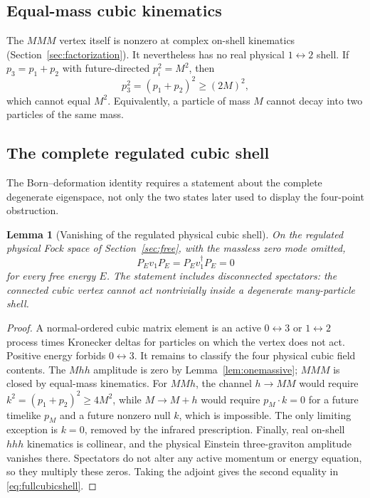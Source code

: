 \documentclass[11pt]{article}
\newtheorem{lemma}[theorem]{Lemma}
\theoremstyle{definition}
\theoremstyle{remark}
\newcommand{\dg}{\dagger}
\begin{document}
\subsection{Equal-mass cubic kinematics}

The $MMM$ vertex itself is nonzero at complex on-shell kinematics
(Section~\ref{sec:factorization}).  It nevertheless has no real physical
$1\leftrightarrow2$ shell.  If $p_3=p_1+p_2$ with future-directed
$p_i^2=M^2$, then
\begin{equation}
p_3^2=(p_1+p_2)^2\ge(2M)^2,
\end{equation}
which cannot equal $M^2$.  Equivalently, a particle of mass $M$ cannot
decay into two particles of the same mass.

\subsection{The complete regulated cubic shell}

The Born--deformation identity requires a statement about the complete
degenerate eigenspace, not only the two states later used to display the
four-point obstruction.

\begin{lemma}[Vanishing of the regulated physical cubic shell]
\label{lem:fullcubicshell}
On the regulated physical Fock space of Section~\ref{sec:free}, with the
massless zero mode omitted,
\begin{equation}\label{eq:fullcubicshell}
P_Ev_1P_E=P_Ev_1^{\dg}P_E=0
\end{equation}
for every free energy $E$.  The statement includes disconnected
spectators: the connected cubic vertex cannot act nontrivially inside a
degenerate many-particle shell.
\end{lemma}

\begin{proof}
A normal-ordered cubic matrix element is an active $0\leftrightarrow3$
or $1\leftrightarrow2$ process times Kronecker deltas for particles on
which the vertex does not act.  Positive energy forbids
$0\leftrightarrow3$.  It remains to classify the four physical cubic
field contents.  The $Mhh$ amplitude is zero by
Lemma~\ref{lem:onemassive}; $MMM$ is closed by equal-mass kinematics.
For $MMh$, the channel $h\to MM$ would require
$k^2=(p_1+p_2)^2\ge4M^2$, while $M\to M+h$ would require
$p_M\cdot k=0$ for a future timelike $p_M$ and a future nonzero null
$k$, which is impossible.  The only limiting exception is $k=0$, removed
by the infrared prescription.  Finally, real on-shell $hhh$ kinematics
is collinear, and the physical Einstein three-graviton amplitude
vanishes there.  Spectators do not alter any active momentum or energy
equation, so they multiply these zeros.  Taking the adjoint gives the
second equality in \eqref{eq:fullcubicshell}.
\end{proof}
\end{document}
